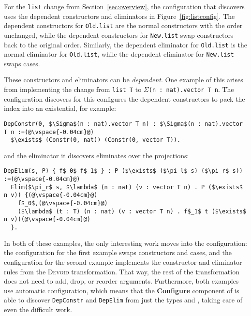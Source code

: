 For the \lstinline{list} change from Section~\ref{sec:overview},
the configuration that \toolname discovers uses the dependent constructors
and eliminators in Figure~\ref{fig:listconfig}. The dependent constructors for \lstinline{Old.list}
are the normal constructors with the order unchanged,
while the dependent constructors for \lstinline{New.list} swap constructors
back to the original order.
Similarly, the dependent eliminator for \lstinline{Old.list} is the normal eliminator for \lstinline{Old.list},
while the dependent eliminator for \lstinline{New.list} swaps cases.

These constructors and eliminators can be \textit{dependent}.
One example of this arises from implementing the change from \lstinline{list T} to $\Sigma$\lstinline{(n : nat).vector T n}.
The configuration \toolname discovers for this configures the dependent constructors to pack the index into an existential, for example:

\begin{lstlisting}
DepConstr(0, $\Sigma$(n : nat).vector T n) : $\Sigma$(n : nat).vector T n :=(@\vspace{-0.04cm}@)
  $\exists$ (Constr(0, nat)) (Constr(0, vector T)).
\end{lstlisting}
and the eliminator it discovers eliminates over the projections:

\begin{lstlisting}
DepElim(s, P) { f$_0$ f$_1$ } : P ($\exists$ ($\pi_l$ s) ($\pi_r$ s)) :=(@\vspace{-0.04cm}@)
  Elim($\pi_r$ s, $\lambda$ (n : nat) (v : vector T n) . P ($\exists$ n v)) {(@\vspace{-0.04cm}@)
    f$_0$,(@\vspace{-0.04cm}@)
    ($\lambda$ (t : T) (n : nat) (v : vector T n) . f$_1$ t ($\exists$ n v))(@\vspace{-0.04cm}@)
  }. 
\end{lstlisting}

In both of these examples, the only interesting work moves into the configuration:
the configuration for the first example swaps constructors and cases,
and the configuration for the second example implements the constructor and eliminator rules from the \textsc{Devoid} transformation.
That way, the rest of the \toolname transformation does not need to add, drop, or reorder arguments.
Furthermore, both examples use automatic configuration, which means that the \textbf{Configure} component of \toolname is able to 
discover \lstinline{DepConstr} and \lstinline{DepElim} from just the types \A and \B, taking care of even the difficult work.

